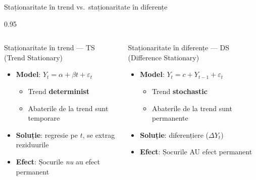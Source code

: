 \documentclass[9pt, aspectratio=169, t]{beamer}
\begin{document}
\begin{frame}{Staționaritate în trend vs.\ staționaritate în diferențe}
    \begin{cminipage}{0.95\textwidth}
        \vspace{-0.2cm}
        {\footnotesize
        \begin{columns}[T]
            \begin{block}{Staționaritate în trend --- TS (Trend Stationary)}
                \begin{itemize}\setlength{\itemsep}{1pt}
                    \item \textbf{Model}: $Y_t = \alpha + \beta t + \varepsilon_t$
                    \begin{itemize}
                        \item Trend \textbf{determinist}
                        \item Abaterile de la trend sunt temporare
                    \end{itemize}
                    \item \textbf{Soluție}: regresie pe $t$, se extrag reziduurile
                    \item \textbf{Efect}: Șocurile \emph{nu} au efect permanent
                \end{itemize}
            \end{block}

            \begin{alertblock}{Staționaritate în diferențe --- DS (Difference Stationary)}
                \begin{itemize}\setlength{\itemsep}{1pt}
                    \item \textbf{Model}: $Y_t = c + Y_{t-1} + \varepsilon_t$
                    \begin{itemize}
                        \item Trend \textbf{stochastic}
                        \item Abaterile de la trend sunt permanente
                    \end{itemize}
                    \item \textbf{Soluție}: diferențiere ($\Delta Y_t$)
                    \item \textbf{Efect}: Șocurile AU efect permanent
                \end{itemize}
            \end{alertblock}
        \end{columns}

}
\end{cminipage}
\end{frame}
\end{document}
